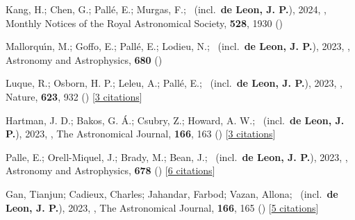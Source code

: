 \item[{\color{numcolor}\scriptsize60}] Kang, H.; Chen, G.; Pall{\'e}, E.; Murgas, F.; \etal\ (incl.\ \textbf{de Leon, J. P.}), 2024, , Monthly Notices of the Royal Astronomical Society, \textbf{528}, 1930 ()

\item[{\color{numcolor}\scriptsize59}] Mallorqu{\'\i}n, M.; Goffo, E.; Pall{\'e}, E.; Lodieu, N.; \etal\ (incl.\ \textbf{de Leon, J. P.}), 2023, , Astronomy and Astrophysics, \textbf{680} ()

\item[{\color{numcolor}\scriptsize58}] Luque, R.; Osborn, H. P.; Leleu, A.; Pall{\'e}, E.; \etal\ (incl.\ \textbf{de Leon, J. P.}), 2023, , Nature, \textbf{623}, 932 () [\href{https://ui.adsabs.harvard.edu/abs/2023Natur.623..932L}{3 citations}]

\item[{\color{numcolor}\scriptsize57}] Hartman, J. D.; Bakos, G. {\'A}.; Csubry, Z.; Howard, A. W.; \etal\ (incl.\ \textbf{de Leon, J. P.}), 2023, , The Astronomical Journal, \textbf{166}, 163 () [\href{https://ui.adsabs.harvard.edu/abs/2023AJ....166..163H}{3 citations}]

\item[{\color{numcolor}\scriptsize56}] Palle, E.; Orell-Miquel, J.; Brady, M.; Bean, J.; \etal\ (incl.\ \textbf{de Leon, J. P.}), 2023, , Astronomy and Astrophysics, \textbf{678} () [\href{https://ui.adsabs.harvard.edu/abs/2023A&A...678A..80P}{6 citations}]

\item[{\color{numcolor}\scriptsize55}] Gan, Tianjun; Cadieux, Charles; Jahandar, Farbod; Vazan, Allona; \etal\ (incl.\ \textbf{de Leon, J. P.}), 2023, , The Astronomical Journal, \textbf{166}, 165 () [\href{https://ui.adsabs.harvard.edu/abs/2023AJ....166..165G}{5 citations}]

